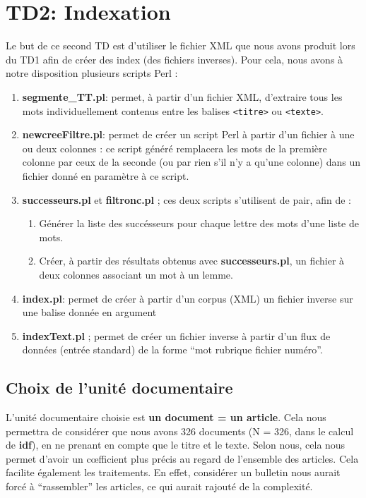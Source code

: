 \chapter{TD2: Indexation}

Le but de ce second TD est d'utiliser le fichier XML que nous avons produit lors du TD1 afin de créer des index (des fichiers inverses). Pour cela, nous avons à notre disposition plusieurs scripts Perl :

\begin{enumerate}
  \item \textbf{segmente\_TT.pl}: permet, à partir d'un fichier XML, d'extraire tous les mots individuellement contenus entre les balises \lstinline{<titre>} ou \lstinline{<texte>}.
  \item \textbf{newcreeFiltre.pl}: permet de créer un script Perl à partir d'un fichier à une ou deux colonnes : ce script généré remplacera les mots de la première colonne par ceux de la seconde (ou par rien s'il n'y a qu'une colonne) dans un fichier donné en paramètre à ce script.
  \item \textbf{successeurs.pl} et \textbf{filtronc.pl} ; ces deux scripts s'utilisent de pair, afin de :
  \begin{enumerate}
    \item Générer la liste des succésseurs pour chaque lettre des mots d'une liste de mots.
    \item Créer, à partir des résultats obtenus avec \textbf{successeurs.pl}, un fichier à deux colonnes associant un mot à un lemme.
  \end{enumerate}
  \item \textbf{index.pl}: permet de créer à partir d'un corpus (XML) un fichier inverse sur une balise donnée en argument
  \item \textbf{indexText.pl} ; permet de créer un fichier inverse à partir d'un flux de données (entrée standard) de la forme ``mot rubrique fichier numéro''.
\end{enumerate}

\section{Choix de l'unité documentaire}

L'unité documentaire choisie est \textbf{un document = un article}. Cela nous permettra de considérer que nous avons 326 documents (N = 326, dans le calcul de \textbf{idf}), en ne prenant en compte que le titre et le texte. Selon nous, cela nous permet d'avoir un c\oe{}fficient plus précis au regard de l'ensemble des articles. Cela facilite également les traitements. En effet, considérer un bulletin nous aurait forcé à ``rassembler'' les articles, ce qui aurait rajouté de la complexité.


